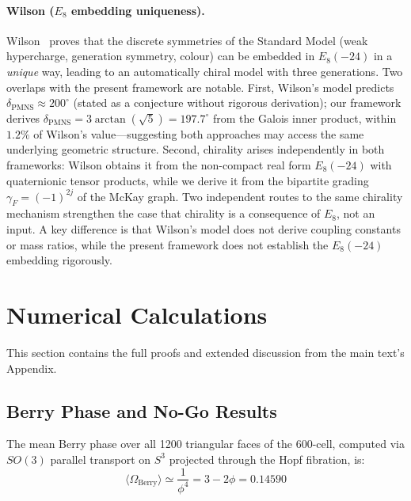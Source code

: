 \documentclass[12pt,a4paper]{article}
\theoremstyle{definition}
\begin{document}
\paragraph{Wilson ($E_8$ embedding uniqueness).}
Wilson~\cite{wilson2024} proves that the discrete symmetries of the Standard Model (weak hypercharge, generation symmetry, colour) can be embedded in $E_8(-24)$ in a \emph{unique} way, leading to an automatically chiral model with three generations.  Two overlaps with the present framework are notable.  First, Wilson's model predicts $\delta_{\mathrm{PMNS}} \approx 200^\circ$ (stated as a conjecture without rigorous derivation); our framework derives $\delta_{\mathrm{PMNS}} = 3\arctan(\sqrt{5}) = 197.7^\circ$ from the Galois inner product, within $1.2\%$ of Wilson's value---suggesting both approaches may access the same underlying geometric structure.  Second, chirality arises independently in both frameworks: Wilson obtains it from the non-compact real form $E_8(-24)$ with quaternionic tensor products, while we derive it from the bipartite grading $\gamma_F = (-1)^{2j}$ of the McKay graph.  Two independent routes to the same chirality mechanism strengthen the case that chirality is a consequence of $E_8$, not an input.  A key difference is that Wilson's model does not derive coupling constants or mass ratios, while the present framework does not establish the $E_8(-24)$ embedding rigorously.


\section{Numerical Calculations}
\label{sec:S-numerics}

This section contains the full proofs and extended discussion from the main text's Appendix.

\subsection{Berry Phase and No-Go Results}

The mean Berry phase over all 1200 triangular faces of the 600-cell, computed via $SO(3)$ parallel transport on $S^3$ projected through the Hopf fibration, is:
\begin{equation}
\langle \Omega_{\text{Berry}} \rangle \simeq \frac{1}{\phi^4}=3-2\phi=0.14590
\end{equation}
\end{document}
